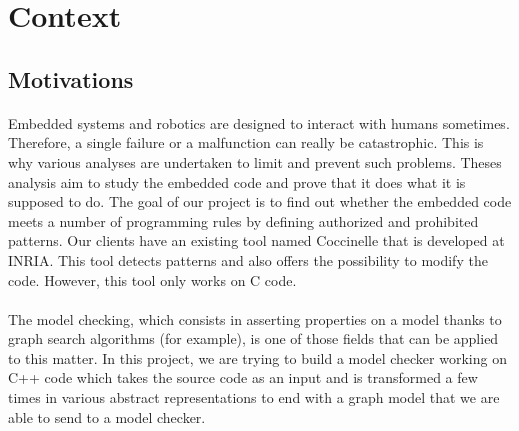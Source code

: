 \documentclass{report}
\begin{document}
\section{Context}

\subsection{Motivations}

\paragraph{}
\hspace{4mm}\textnormal{   Embedded systems and robotics are designed to interact with 
humans sometimes. Therefore, a single failure or a malfunction 
can really be catastrophic.  This is why various analyses are 
undertaken to limit and prevent such problems. Theses analysis aim
 to study the embedded code and prove that it does what it is 
supposed to do. The goal of our project is to find out whether the
 embedded code meets a number of programming rules by 
defining authorized and prohibited patterns. 
Our clients have an existing tool named Coccinelle that is 
developed at INRIA. This tool detects patterns and also offers
 the possibility to modify the code. However, this tool only works
 on C code. 
}

\paragraph{}
\hspace{4mm}\textnormal{The model checking, which consists in asserting properties 
on a model thanks to graph search algorithms (for example),
 is one of those fields that can be applied to this matter.
 In this project, we are trying to build a model checker working
 on C++ code which takes the source code as an input and is 
transformed a few times in various abstract representations to end 
with a graph model that we are able to send to a model checker.}

\subsubsection{}
\end{document}
